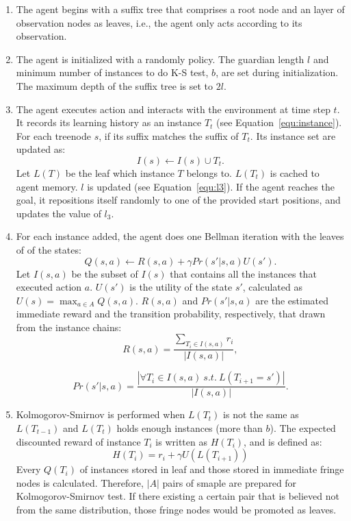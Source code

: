 \documentclass{article}
\begin{document}
\begin{enumerate}

  \item The agent begins with a suffix tree that comprises a root node and an layer of
  observation nodes as leaves, i.e., the agent only acts according to its observation.

  \item The agent is initialized with a randomly policy. The guardian length $l$ and
  minimum number of instances to do K-S test, $b$, are set during initialization. The
  maximum depth of the suffix tree is set to $2l$.

  \item The agent executes action and interacts with the environment at time step $t$.
  It records its learning history as an instance $T_t$ (see Equation~\ref{equ:instance}).
  For each treenode $s$, if its suffix matches the suffix of $T_t$. Its instance
  set are updated as:
    \begin{equation}
      I(s) \leftarrow I(s) \cup {T_t}.
    \end{equation}
  Let $L(T)$ be the leaf which instance $T$ belongs to. $L(T_t)$ is cached to agent memory.
  $l$ is updated (see Equation~\ref{equ:l3}). If the agent reaches the goal,
  it repositions itself randomly to one of the provided start positions, and updates
  the value of $l_3$.

  \item For each instance added, the agent does one Bellman iteration with the leaves of
  of the states:
    \begin{equation}
      Q(s,a) \leftarrow R(s,a)  + \gamma Pr(s'|s,a)U(s').
    \end{equation}
  Let $I(s,a)$ be the subset of $I(s)$ that contains all the instances that executed
  action $a$. $U(s')$ is the utility of the state $s'$, calculated as
  $U(s) = \max_{a \in A} Q(s,a)$. $R(s,a)$ and $Pr(s'|s,a)$ are the estimated immediate
  reward and the transition probability, respectively, that drawn from the instance chains:
    \begin{equation}
      R(s,a) = \frac{\sum_{T_i \in I(s,a)}r_i} {|I(s,a)|},
    \end{equation}

    \begin{equation}
      Pr(s'|s,a) = \frac{|\forall{T_i \in I(s,a) \ s.t. \ L(T_{i+1} = s')}|} {|I(s,a)|}.
    \end{equation}
  
  \item Kolmogorov-Smirnov is performed when $L(T_t)$ is not the same as $L(T_{t-1})$ and
  $L(T_t)$ holds enough instances (more than $b$). The expected discounted reward of instance
  $T_i$ is written as $H(T_i)$, and is defined as:
    \begin{equation}
      H(T_i) = r_i + \gamma U(L(T_{i+1}))
    \end{equation}
  Every $Q(T_i)$ of instances stored in leaf and those stored in immediate fringe nodes is
  calculated. Therefore, $|A|$ pairs of smaple are prepared for Kolmogorov-Smirnov test. If
  there existing a certain pair that is believed not from the same distribution, those
  fringe nodes would be promoted as leaves.


\end{enumerate}
\end{document}
